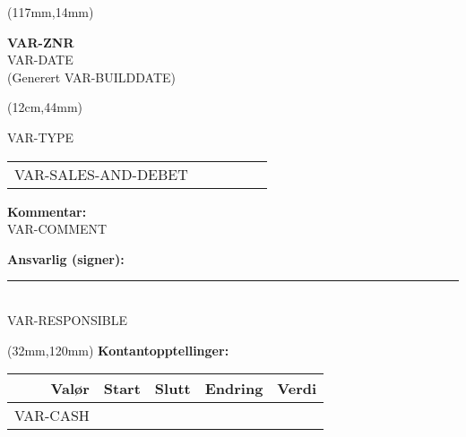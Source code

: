 \documentclass[a4paper, 12pt]{article}
\begin{document}
\begin{textblock*}{47mm}(117mm,14mm)
    \begin{center}
        \Large
        \textbf{VAR-ZNR}
        \normalsize
        \\[1mm]
        VAR-DATE
        \\[1mm]
        \scriptsize{(Generert VAR-BUILDDATE)}
    \end{center}
\end{textblock*}


\begin{textblock*}{8cm}(12cm,44mm)

    VAR-TYPE



    \vspace{5mm}


    \hskip-1.5cm\begin{tabularx}{\textwidth + 1.5cm}{rrcrrX}
        VAR-SALES-AND-DEBET
    \end{tabularx}
    \vspace{5mm}


    \textbf{Kommentar:} \\
VAR-COMMENT


    \vspace{8mm}
    \textbf{Ansvarlig (signer):} \\[8mm]
    \rule{5cm}{0.5pt} \\
    VAR-RESPONSIBLE

\end{textblock*}

\begin{textblock*}{71mm}(32mm,120mm)
    \textbf{Kontantopptellinger:} \\[3mm]
    \begin{tabular}{rrrrr}
        Valør & Start & Slutt & Endring & Verdi \\
        \hline
        VAR-CASH
    \end{tabular}
\end{textblock*}
\end{document}
